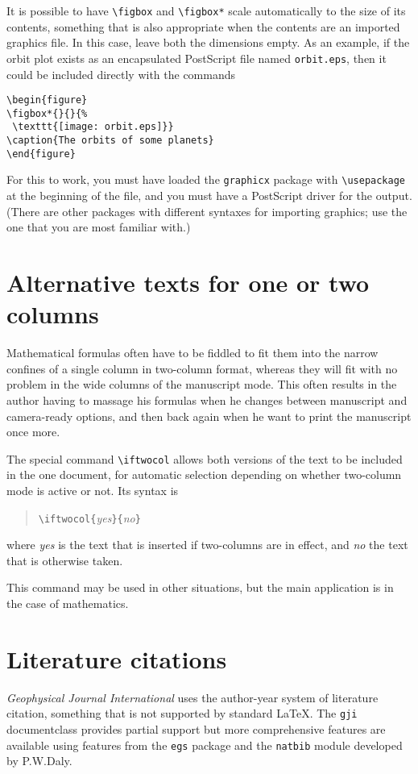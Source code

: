 \documentclass[extra,mreferee]{gji}
\begin{document}
It is possible to have \verb!\figbox! and \verb!\figbox*! scale automatically
to the size of its contents, something that is also appropriate when the
contents are an imported graphics file. In this case, leave both the
dimensions empty. As an example, if the orbit plot exists as an encapsulated
PostScript file named \texttt{orbit.eps}, then it could be included directly
with the commands
\begin{verbatim}
\begin{figure}
\figbox*{}{}{%
 \texttt{[image: orbit.eps]}}
\caption{The orbits of some planets}
\end{figure}
\end{verbatim}
For this to work, you must have loaded the \texttt{graphicx} package with
\verb!\usepackage! at the beginning of the file, and you must have a
PostScript driver for the output. (There are other packages with
different syntaxes for importing graphics; use the one that you are
most familiar with.)


\section{Alternative texts for one or two columns}
Mathematical formulas often have to be fiddled to fit them into the
narrow confines of a single column in two-column format, whereas they
will fit with no problem in the wide columns of the manuscript mode.
This often results in the author having to massage his formulas when he
changes between manuscript and camera-ready options, and then back again
when he want to print the manuscript once more.

The special command \verb!\iftwocol! allows both versions of the text to
be included in the one document, for automatic selection depending on
whether two-column mode is active or not. Its syntax is\label{iftwocol}
\begin{quote}
\normalsize
\verb!\iftwocol{!{\em yes\/}\verb!}{!{\em no\/}\verb!}!
\end{quote}
where {\em yes\/} is the text that is inserted if two-columns are in
effect, and {\em no\/} the text that is otherwise taken.

This command may be used in other situations, but the main application 
is in the case of mathematics.

\section{Literature citations}
\textit{Geophysical Journal International} uses the
author-year system of literature citation, something that is not
supported by standard \LaTeX. The \verb"gji" documentclass
provides partial support but more comprehensive features are 
available using features from the \verb"egs" package and the
\verb"natbib" module developed by P.W.Daly. 
\end{document}

